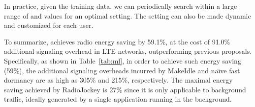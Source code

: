 In practice, given the training data, we can periodically search within a large range of \BT and \SBT values for an optimal setting. The setting can also be made dynamic and customized for each user.

To summarize, \NAME achieves radio energy saving by 59.1\%, at the cost of 91.0\% additional signaling overhead in LTE networks, outperforming previous proposals. Specifically, as shown in Table~\ref{tab:ml}, in order to achieve such energy saving (59\%), the additional signaling overheads incurred by MakeIdle and na\"{\i}ve fast dormancy are as high as 305\% and 215\%, respectively. The maximal energy saving achieved by RadioJockey is 27\% since it is only applicable to background traffic, ideally generated by a single application running in the background.


